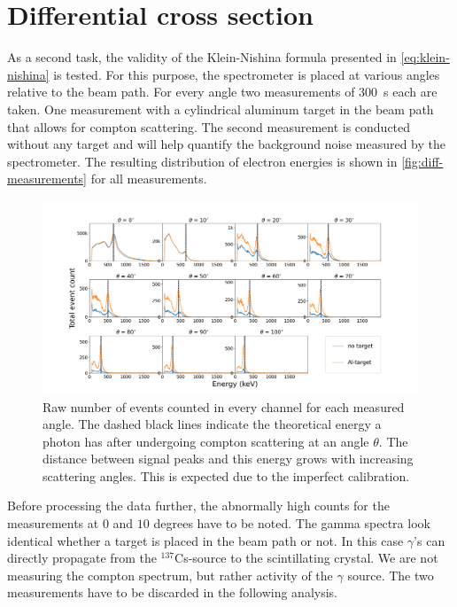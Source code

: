 
\section{Differential cross section}
\label{sec:differential-cross-section}

As a second task, the validity of the Klein-Nishina formula presented in
\autoref{eq:klein-nishina} is tested. For this purpose, the spectrometer is placed
at various angles relative to the beam path. For every angle two measurements of
\SI{300}{\second} each are taken. One measurement with a cylindrical aluminum target
in the beam path that allows for compton scattering. The second measurement is
conducted without any target and will help quantify the background noise measured
by the spectrometer. The resulting distribution of electron energies is shown in
\autoref{fig:diff-measurements} for all measurements.

\begin{figure}
  \includegraphics[width=1.0\textwidth]{./fig/differential measurements.png}
\caption{Raw number of events counted in every channel for each measured angle.
  The dashed black lines indicate the theoretical energy a photon has after
  undergoing compton scattering at an angle $\theta$. The distance between signal
  peaks and this energy grows with increasing scattering angles. This is expected
  due to the imperfect calibration.}\label{fig:diff-measurements}
\end{figure}

Before processing the data further, the abnormally high counts for the measurements
at $0$ and $10$ degrees have to be noted. The gamma spectra look identical whether a
target is placed in the beam path or not. In this case $\gamma$'s can directly
propagate from the $^{137}$Cs-source to the scintillating crystal. We are not
measuring the compton spectrum, but rather activity of the $\gamma$ source. The two
measurements have to be discarded in the following analysis.

